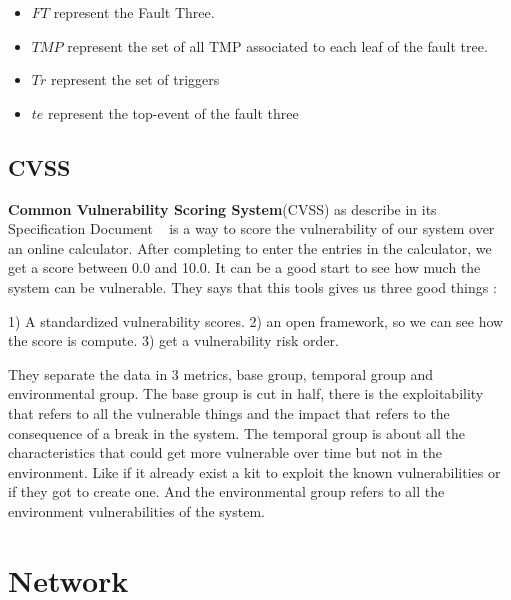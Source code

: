 \begin{itemize}

\item $FT$ represent the Fault Three.

\item $TMP$ represent the set of all TMP associated to each leaf of the fault tree.

\item $Tr$ represent the set of triggers

\item $te$ represent the top-event of the fault three

\end{itemize}

\subsection{CVSS}


\textbf{Common Vulnerability Scoring System}(CVSS) as describe in its Specification
Document ~\cite{CVSS} is a way to score the vulnerability of our system
over an online calculator. After completing to enter the entries in
the calculator, we get a score between 0.0 and 10.0. It can be a good
start to see how much the system can be vulnerable. \newline
They says that this tools gives us three good things :

1) A standardized vulnerability scores.
2) an open framework, so we can see how the score is compute.
3) get a vulnerability risk order.

They separate the data in 3 metrics, base group, temporal group and
environmental group. \newline 
The base group is cut in half, there is the exploitability that refers
to all the vulnerable things and the impact that refers to the
consequence of a break in the system. \newline
The temporal group is about all the characteristics that could get
more vulnerable over time but not in the environment. Like if it
already exist a kit to exploit the known vulnerabilities or if they
got to create one. \newline
And the environmental group refers to all the environment
vulnerabilities of the system.

\newpage

\section {Network}

